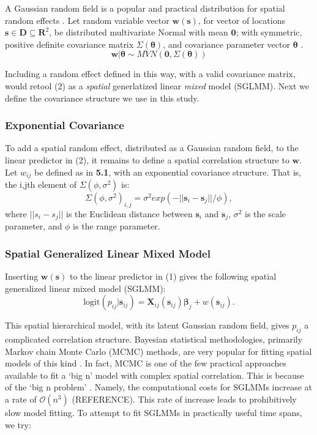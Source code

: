 A Gaussian random field is a popular and practical distribution for spatial random effects \citep{Gelfand2010}. Let random variable vector $\pmb{w}(\pmb{s})$, for vector of locations $\pmb{s} \in \pmb{D} \subseteq \pmb{R}^{2}$, be distributed multivariate Normal with mean $\pmb{0}$; with symmetric, positive definite covariance matrix $\Sigma(\pmb{\theta})$, and covariance parameter vector $\pmb{\theta}$ \citep{Haran2011}.
\begin{equation}
\pmb{w} | \pmb{\theta} \sim MVN(\pmb{0}, \Sigma(\pmb{\theta})) 
\end{equation}

Including a random effect defined in this way, with a valid covariance matrix, would retool (2) as a {\it spatial} generlatized linear {\it mixed} model (SGLMM). Next we define the covariance structure we use in this study.

\subsubsection{Exponential Covariance}
To add a spatial random effect, distributed as a Gaussian random field, to the linear predictor in (2), it remains to define a spatial correlation structure to $\pmb{w}$. Let $w_{ij}$ be defined as in {\bf 5.1}, with an exponential covariance structure. That is, the i,jth element of $\Sigma(\phi, \sigma^{2})$ is:
\begin{equation}
\Sigma(\phi, \sigma^{2})_{i,j} = \sigma^{2} exp(-||\pmb{s}_{i} - \pmb{s}_{j}||/\phi),
\end{equation}
where $||s_{i} - s_{j}||$ is the Euclidean distance between $\pmb{s}_{i}$ and $\pmb{s}_{j}$, $\sigma^{2}$ is the scale parameter, and $\phi$ is the range parameter.

\subsubsection{Spatial Generalized Linear Mixed Model}
Inserting $\pmb{w}(\pmb{s})$ to the linear predictor in (1) gives the following spatial generalized linear mixed model (SGLMM):
\begin{equation}
\text{logit}(p_{ij}|\pmb{s}_{ij}) = \pmb{X}_{ij}(\pmb{s}_{ij}) \pmb{\beta}_{j} + w(\pmb{s}_{ij}).
\end{equation}

This spatial hierarchical model, with its latent Gaussian random field, gives $p_{ij}$ a complicated correlation structure. Bayesian statistical methodologies, primarily Markov chain Monte Carlo (MCMC) methods, are very popular for fitting spatial models of this kind \citep{Banerjee2014}. In fact, MCMC is one of the few practical approaches available to fit a `big n' model with complex spatial correlation. This is because of the `big n problem' \citep{Lindgren2011}. Namely, the computational costs for SGLMMs increase at a rate of $\mathcal{O}(n^{3})$ (REFERENCE). This rate of increase leads to prohibitively slow model fitting. To attempt to fit SGLMMs in practically useful time spans, we try: 

